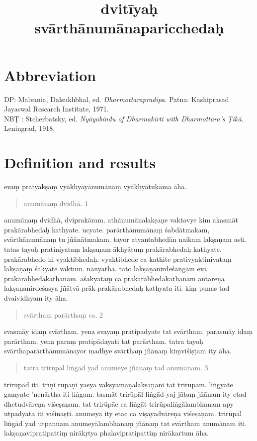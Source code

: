 \documentclass{article}
\title{dvitīyaḥ svārthānumānaparicchedaḥ}
\author{}
\date{}
\begin{document}
\beginnumbering
\maketitle
\section*{Abbreviation}
DP: Malvania, Dalsukhbhal, ed. \textit{Dharmottarapradīpa}. Patna: Kashiprasad Jayaswal Research Institute, 1971.\\
NB\d{T} : Stcherbatsky, ed. \textit{Nyāyabindu of Dharmakīrti with Dharmottara's Ṭikā}. Leningrad, 1918.
\baselineskip
\section{Definition and results}
\pstart
{}evaṃ pratyakṣaṃ vyākhyāyānumānaṃ vyākhyātukāma āha. 

 \begin{quote}
 anumānaṃ dvidhā. 1 
 \end{quote}

anumānaṃ dvidhā, dviprakāram. athānumānalakṣaṇe vaktavye kim akasmāt prakārabhedaḥ kathyate. ucyate. parārthānumānaṃ śabdātmakam, svārthānumānaṃ tu jñānātmakam. tayor atyantabhedān naikam lakṣaṇam asti. tatas tayoḥ pratiniyataṃ lakṣaṇam ākhyātuṃ prakārabhedaḥ kathyate. prakārabhedo hi vyaktibhedaḥ. vyaktibhede ca kathite prativyaktiniyataṃ lakṣaṇaṃ śakyate vaktum. nānyathā. tato lakṣaṇanirdeśāṅgam eva prakārabhedakathanam. aśakyatāṃ ca prakārabhedakathanam antareṇa lakṣaṇanirdeśasya jñātvā prāk prakārabhedaḥ kathyata iti.
\pend
\pstart
{}kiṃ punas tad dvaividhyam ity āha. 

\begin{quote}
svārthaṃ parārthaṃ ca. 2
\end{quote}

svasmāy idaṃ svārtham. yena svayaṃ pratipadyate tat svārtham. parasmāy idaṃ parārtham. yena paraṃ pratipādayati tat parārtham.
\pend
\pstart
tatra tayoḥ svārthaparārthānumānayor madhye svārthaṃ jñānaṃ kiṃviśiṣṭam ity āha. 

\begin{quote}
tatra trirūpāl liṅgād yad anumeye jñānaṃ tad anumānam. 3
\end{quote}

trirūpād iti. trīṇi rūpāṇi yasya vakṣyamāṇalakṣaṇāni tat trirūpam. liṅgyate gamyate 'nenārtha iti liṅgam. tasmāt trirūpāl liṅgād yaj jātaṃ jñānam ity etad dhetudvāreṇa viśeṣaṇam. tat trirūpāc ca liṅgāt trirūpaliṅgālambhanam apy utpadyata iti viśinaṣṭi. anumeya ity etac ca viṣayadvāreṇa viśeṣaṇam.
\pend
\pstart
trirūpāl liṅgād yad utpannam anumeyālambhanaṃ jñānaṃ tat svārtham anumānam iti.
\pend
\pstart
 lakṣaṇavipratipattiṃ nirākṛtya phalavipratipattiṃ nirākartum āha. 
\end{document}
